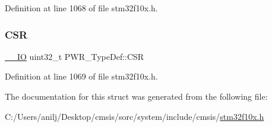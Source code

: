 Definition at line 1068 of file stm32f10x.\+h.

\mbox{\label{struct_p_w_r___type_def_ae17097e69c88b6c00033d6fb84a8182b}} 
\subsubsection{\texorpdfstring{C\+SR}{CSR}}
{\footnotesize\ttfamily \hyperlink{core__sc300_8h_aec43007d9998a0a0e01faede4133d6be}{\+\_\+\+\_\+\+IO} uint32\+\_\+t P\+W\+R\+\_\+\+Type\+Def\+::\+C\+SR}



Definition at line 1069 of file stm32f10x.\+h.



The documentation for this struct was generated from the following file\+:\begin{DoxyCompactItemize}
\item 
C\+:/\+Users/anilj/\+Desktop/cmsis/sorc/system/include/cmsis/\hyperlink{stm32f10x_8h}{stm32f10x.\+h}\end{DoxyCompactItemize}
